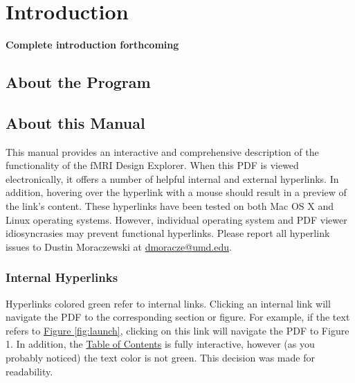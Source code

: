 \documentclass[10pt]{article}
\begin{document}
\section{Introduction}
\label{sec:into}
	\textbf{Complete introduction forthcoming}

	\subsection{About the Program}
	\label{subsec:intro.prog}

	\subsection{About this Manual}
	\label{subsec:intro.manu}
		This manual provides an interactive and comprehensive description of the functionality of the fMRI Design Explorer.
		When this PDF is viewed electronically, it offers a number of helpful internal and external hyperlinks.
		In addition, hovering over the hyperlink with a mouse should result in a preview of the link's content.
		These hyperlinks have been tested on both Mac OS X and Linux operating systems.
		However, individual operating system and PDF viewer idiosyncrasies may prevent functional hyperlinks.
		Please report all hyperlink issues to Dustin Moraczewski at \href{mailto:dmoracze@umd.edu}{dmoracze@umd.edu}.

		\subsubsection{Internal Hyperlinks}
		\label{subsubsec:internal}
			Hyperlinks colored \textcolor{PineGreen}{green} refer to internal links.
			Clicking an internal link will navigate the PDF to the corresponding section or figure.
			For example, if the text refers to \hyperref[fig:launch]{Figure \ref{fig:launch}}, clicking on this link will navigate the PDF to Figure 1.
			In addition, the \hyperref[sec:toc]{Table of Contents} is fully interactive, however (as you probably noticed) the text color is not \textcolor{PineGreen}{green}.
			This decision was made for readability.
\end{document}
